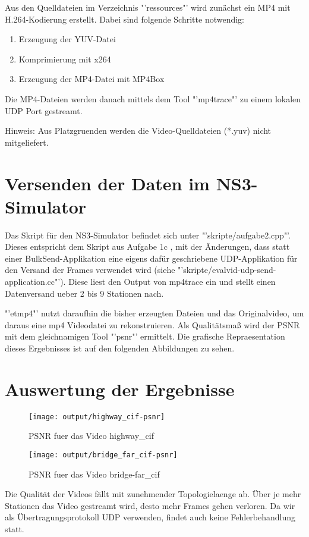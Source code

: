 \documentclass[12pt,a4paper,titlepage]{article}
\begin{document}
Aus den Quelldateien im Verzeichnis "'ressources"' wird zunächst ein MP4 mit H.264-Kodierung erstellt. Dabei sind folgende Schritte notwendig:
\begin{enumerate}
\item Erzeugung der YUV-Datei
\item Komprimierung mit x264
\item Erzeugung der MP4-Datei mit MP4Box
\end{enumerate}
Die MP4-Dateien werden danach mittels dem Tool "'mp4trace"' zu einem lokalen UDP Port gestreamt.

\begin{center}
Hinweis: Aus Platzgruenden werden die Video-Quelldateien (*.yuv) nicht mitgeliefert.
\end{center}


\section{Versenden der Daten im NS3-Simulator}

Das Skript für den NS3-Simulator befindet sich unter "'skripte/aufgabe2.cpp"'. Dieses entspricht dem Skript aus Aufgabe 1c , mit der Änderungen, dass statt einer BulkSend-Applikation eine eigens dafür geschriebene UDP-Applikation für den Versand der Frames verwendet wird (siehe "'skripte/evalvid-udp-send-application.cc"'). Diese liest den Output von mp4trace ein und stellt einen Datenversand ueber 2 bis 9 Stationen nach.

"'etmp4"' nutzt daraufhin die bisher erzeugten Dateien und das Originalvideo, um daraus eine mp4 Videodatei zu rekonstruieren. Als Qualitätsmaß wird der PSNR mit dem gleichnamigen Tool "'psnr"' ermittelt. Die grafische Repraesentation dieses Ergebnisses ist auf den folgenden Abbildungen zu sehen.

\section{Auswertung der Ergebnisse}

\begin{figure}[h]
	\centering
% 	
	\texttt{[image: output/highway\_cif-psnr]}
	\caption{PSNR fuer das Video highway\_cif}
	\label{fig:Durchsatz}
\end{figure}

\begin{figure}[h]
 	\centering
% 	
 	\texttt{[image: output/bridge\_far\_cif-psnr]}
 	\caption{PSNR fuer das Video bridge-far\_cif}
 	\label{fig:Durchsatz2}
\end{figure}

Die Qualität der Videos fällt mit zunehmender Topologielaenge ab. Über je mehr Stationen das Video gestreamt wird, desto mehr Frames gehen verloren. Da wir als Übertragungsprotokoll UDP verwenden, findet auch keine Fehlerbehandlung statt.
\end{document}

